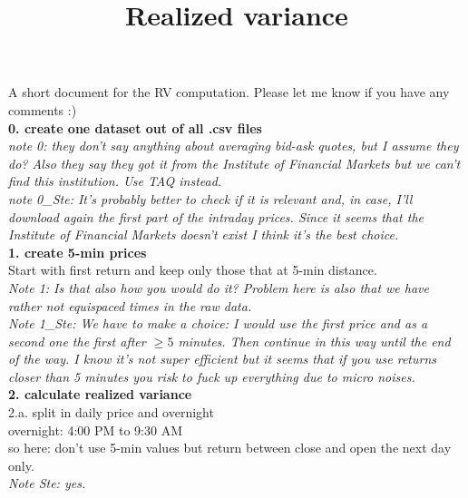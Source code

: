 \documentclass{article}
\title{Realized variance}
\begin{document}
\maketitle

A short document for the RV computation. Please let me know if you have any comments :)\\

\textbf{0. create one dataset out of all .csv files}\\

\textit{note 0: they don't say anything about averaging bid-ask quotes, but I assume they do? Also they say they got it from the Institute of Financial Markets but we can't find this institution. Use TAQ instead.}\\

\textit{note 0\_Ste: It's probably better to check if it is relevant and, in case, I'll download again the first part of the intraday prices. Since it seems that the Institute of Financial Markets doesn't exist I think it's the best choice.}\\

\textbf{1. create 5-min prices}\\

Start with first return and keep only those that at 5-min distance.\\

\textit{Note 1: Is that also how you would do it? Problem here is also that we have rather not equispaced times in the raw data.}\\

\textit{Note 1\_Ste: We have to make a choice: I would use the first price and as a second one the first after $\ge5$ minutes. Then continue in this way until the end of the way. I know it's not super efficient but it seems that if you use returns closer than 5 minutes you risk to fuck up everything due to micro noises.}\\

\textbf{2. calculate realized variance}\\

2.a. split in daily price and overnight\\

overnight: 4:00 PM to 9:30 AM\\ 

so here: don't use 5-min values but return between close and open the next day only.\\

\textit{Note Ste: yes.}\\
\end{document}

